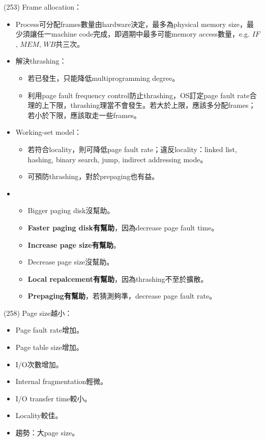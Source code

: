 \begin{theorem}{(253)} Frame allocation：\begin{itemize}
        \item Process可分配frames數量由hardware決定，最多為physical memory size，最少須讓任一machine code完成，即週期中最多可能memory access數量，e.g. $IF$, $MEM$, $WB$共三次。
        \item 解決thrashing：\begin{itemize}
            \item 若已發生，只能降低multiprogramming degree。
            \item 利用page fault frequency control防止thrashing，OS訂定page fault rate合理的上下限，thrashing理當不會發生。若大於上限，應該多分配frames；若小於下限，應該取走一些frames。
        \end{itemize}
        \item Working-set model：\begin{itemize}
            \item 若符合locality，則可降低page fault rate；違反locality：linked list, hashing, binary search, jump, indirect addressing mode。
            \item 可預防thrashing，對於prepaging也有益。
        \end{itemize}
        \item \begin{itemize}
            \item Bigger paging disk沒幫助。
            \item \textbf{Faster paging disk有幫助}，因為decrease page fault time。
            \item \textbf{Increase page size有幫助}。
            \item Decrease page size沒幫助。
            \item \textbf{Local repalcement有幫助}，因為thrashing不至於擴散。
            \item \textbf{Prepaging有幫助}，若猜測夠準，decrease page fault rate。
        \end{itemize}
    \end{itemize}
\end{theorem}

\begin{theorem}{(258)} Page size越小：\begin{itemize}
        \item Page fault rate增加。
        \item Page table size增加。
        \item I/O次數增加。
        \item Internal fragmentation輕微。
        \item I/O transfer time較小。
        \item Locality較佳。
        \item 趨勢：大page size。
    \end{itemize} 
\end{theorem}

